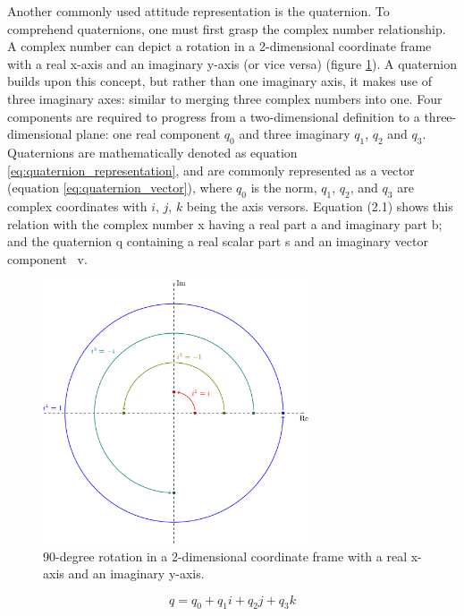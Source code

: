Another commonly used attitude representation is the quaternion. To comprehend quaternions, one must first grasp the complex number relationship. A complex number can depict a rotation in a 2-dimensional coordinate frame with a real x-axis and an imaginary y-axis (or vice versa) (figure \ref{fig:complex_rotation}). A quaternion builds upon this concept, but rather than one imaginary axis, it makes use of three imaginary axes: similar to merging three complex numbers into one. Four components are required to progress from a two-dimensional definition to a three-dimensional plane: one real component $q_0$ and three imaginary $q_1$, $q_2$ and $q_3$. Quaternions are mathematically denoted as equation \ref{eq:quaternion_representation}, and are commonly represented as a vector (equation \ref{eq:quaternion_vector}), where $q_0$ is the norm, $q_1$, $q_2$, and $q_3$ are complex coordinates with $i$, $j$, $k$ being the axis versors. Equation (2.1) shows this relation with the complex number x having a real part a and imaginary part b; and the quaternion q containing a real scalar part s and an imaginary vector component ~v.

\begin{figure}[!h]
    \centering
    \includegraphics[width=0.7\textwidth]{figures/complex_rotation.pdf}
    \caption{90-degree rotation in a 2-dimensional coordinate frame with a real x-axis and an imaginary y-axis. }
    \label{fig:complex_rotation}
\end{figure}

\begin{equation}
    q = q_0 + q_1 i + q_2 j + q_3 k
    \label{eq:quaternion_representation}
\end{equation}

